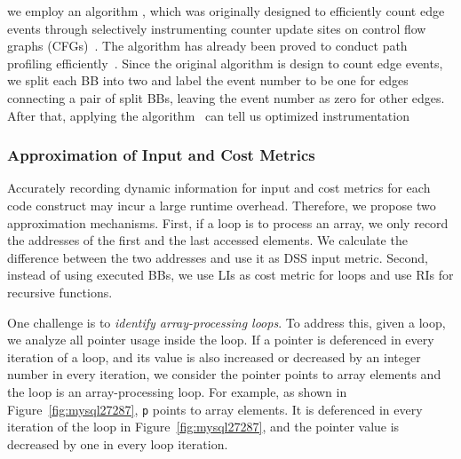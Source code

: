 we employ an algorithm , 
which was originally designed to efficiently 
count edge events through selectively instrumenting counter update sites 
on control flow graphs (CFGs)~\cite{event-counting}.
The algorithm has already been proved to conduct path 
profiling efficiently~\cite{path-profiling,peter-ase}.  
Since the original algorithm is design to count edge events, 
we split each BB into two and label the event number to be one for 
edges connecting a pair of split BBs, 
leaving the event number as zero for other edges. 
After that, applying the algorithm~\cite{event-counting}
can tell us optimized instrumentation  


\subsubsection{Approximation of Input and Cost Metrics}


Accurately recording dynamic information for input and cost metrics
for each code construct
may incur a large runtime overhead.
Therefore, we propose two approximation mechanisms. 
First, if a loop is to process an array, 
we only record the addresses of the first 
and the last accessed elements. 
We calculate the difference between the two addresses and use it as DSS input metric. 
Second, instead of using executed BBs, 
we use LIs as cost metric for loops 
and use RIs for recursive functions. 


One challenge is to \emph{identify array-processing loops}. 
%
To address this, given a loop, we analyze all pointer usage inside the loop. 
If a pointer is deferenced in every iteration of a loop, 
and its value is also increased or decreased by 
an integer number in every iteration,
we consider the pointer points to array elements and 
the loop is an array-processing loop.  
For example, as shown in Figure~\ref{fig:mysql27287}, 
\texttt{p} points to array elements. 
It is deferenced in every iteration of the loop 
in Figure~\ref{fig:mysql27287},
and the pointer value is decreased by one in every loop iteration. 


